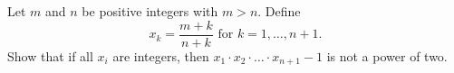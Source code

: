 Let $m$ and $n$ be positive integers with $m>n$. Define
$$x_k = \frac{m+k}{n+k}\text{ for }k=1, \ldots, n+1.$$
Show that if all $x_i$ are integers, then $x_1\cdot x_2 \cdot \ldots \cdot x_{n+1} - 1$ is not a power of two.